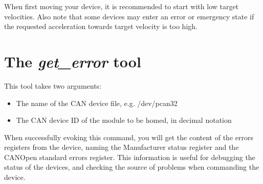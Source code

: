 When first moving your device, it is recommended to start with low target velocities. Also note that some devices may enter an error or emergency state if the requested acceleration towards target velocity is too high.

\section{The {\em get\_error} tool}

This tool takes two arguments:

\begin{itemize}
\item The name of the CAN device file, e.g. /dev/pcan32
\item The CAN device ID of the module to be homed, in decimal notation
\end{itemize}

When successfully evoking this command, you will get the content of the errors registers from the device, naming the Manufacturer status register and the CANOpen standard errors register. This information is useful for debugging the status of the devices, and checking the source of problems when commanding the device.


